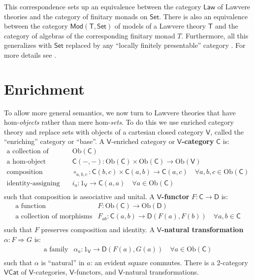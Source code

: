 \documentclass{amsart}
\theoremstyle{definition}
\newcommand{\Set}{\mathsf{Set}}
\newcommand{\Cat}{\mathsf{Cat}}
\newcommand{\Law}{\mathsf{Law}}
\newcommand{\Mod}{\mathsf{Mod}}
\newcommand{\V}{\mathsf{V}}
\newcommand{\D}{\mathsf{D}}
\newcommand{\C}{\mathsf{C}}
\newcommand{\T}{\mathsf{T}}
\newcommand{\Obj}{\mathrm{Ob}}
\newcommand{\maps}{\colon}
\begin{document}
This correspondence sets up an equivalence between the category $\Law$ of Lawvere theories and the category of finitary monads on $\Set$.  There is also an equivalence between the category $\Mod(\T,\Set)$ of models of a Lawvere theory $\T$ and the category of algebras of the corresponding finitary monad $T$.  Furthermore, all this generalizes with $\Set$ replaced by any ``locally finitely presentable'' category \cite{adamekrosicky}. For more details see \cite{barrwells,lawvere,milewski}.

\section{Enrichment}
\label{sec:enrichment}

To allow more general semantics, we now turn to Lawvere theories that have hom-\emph{objects} rather than mere hom-\emph{sets}.  To do this we use enriched category theory \cite{kelly} and replace sets with objects of a cartesian closed category $\V$, called the ``enriching'' category or ``base''.    A $\V$-enriched category or \textbf{$\V$-category} $\C$ is:
\[\begin{array}{rl}
\text{a collection of objects} & \Obj(\C)\\
\text{a hom-object function} & \C(-,-)\maps \Obj(\C) \times \Obj(\C) \to \Obj(\V)\\
\text{composition morphisms} & \circ_{a,b,c}\maps\C(b,c) \times \C(a,b) \to \C(a,c) \quad \forall a,b,c \in \Obj(\C)\\
\text{identity-assigning morphisms} & i_a\maps 1_\V \to\C(a,a) \quad \forall a \in \Obj(\C)\\
\end{array}\]
such that composition is associative and unital.  A \textbf{$\V$-functor} $F \maps \C \to \D$ is:
\[\begin{array}{rl}
\text{a function} & F\maps \Obj(\C) \to \Obj(\D)\\
\text{a collection of morphisms} & F_{ab}\maps \C(a,b) \to \D(F(a),F(b)) \quad \forall a,b \in \C\\
\end{array}\]
such that $F$ preserves composition and identity.  A \textbf{$\V$-natural transformation} $\alpha\maps F \Rightarrow G$ is:
\[\begin{array}{rl}
\text{a family} & \alpha_a \maps 1_\V \to \D(F(a),G(a)) \quad \forall a \in \Obj(\C)\\
\end{array}\]
such that $\alpha$ is ``natural'' in $a$: an evident square commutes.   There is a 2-category \textbf{$\V\Cat$} of $\V$-categories, $\V$-functors, and $\V$-natural transformations. 
\end{document}
